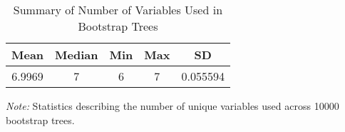 \begin{table}[ht]
\centering
\begin{tabular}{ccccc}
 Mean & Median & Min & Max & SD \\ 
\midrule
 6.9969 & 7 & 6 & 7 & 0.055594 \\ 
  \end{tabular}
\caption*{\textit{Note:} Statistics describing the number of unique variables used across 10000 bootstrap trees.}
\caption{Summary of Number of Variables Used in Bootstrap Trees} 
\label{tab:var_count}
\end{table}
